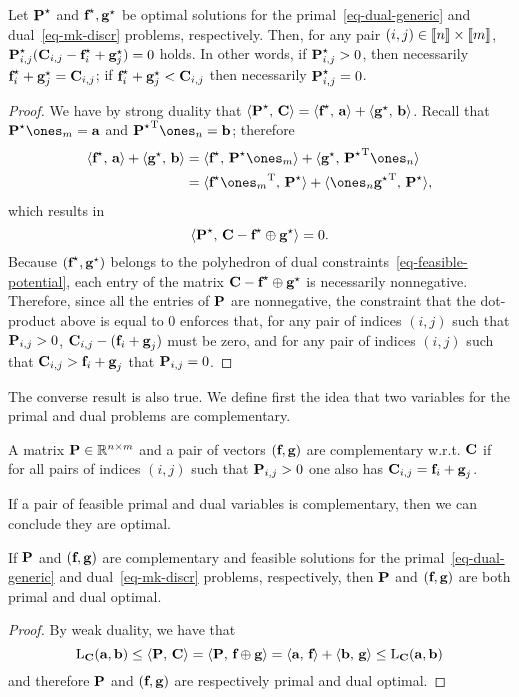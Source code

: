 \begin{prop}\label{prop-primal-dual-optimal}Let $\P^\star$ and $\fD^\star,\gD^\star$ be optimal solutions for the primal~\eqref{eq-dual-generic} and dual~\eqref{eq-mk-discr} problems, respectively. Then, for any pair $(i,j)\in\range{n}\times\range{m}$, $\P^\star_{i,j}(\C_{i,j}-\fD^\star_i+\gD^\star_j)=0$ holds. In other words, if $\P^\star_{i,j}>0$, then necessarily $\fD^\star_i+\gD^\star_j=\C_{i,j}$; if $\fD^\star_i+\gD^\star_j<\C_{i,j}$ then necessarily $\P^\star_{i,j}=0$.
\end{prop}
\begin{proof} We have by strong duality that $\dotp{\P^\star}{\C} = \dotp{\fD^\star}{\a}+\dotp{\gD^\star}{\b}$. Recall that $\P^\star\ones_m = \a$ and $\transp{\P^\star}\ones_n = \b$; therefore 
	$$\begin{aligned}\dotp{\fD^\star}{\a}+\dotp{\gD^\star}{\b} &= \dotp{\fD^\star}{\P^\star\ones_m}+\dotp{\gD^\star}{\transp{\P^\star}\ones_n}\\&=  \dotp{\fD^\star\transp{\ones_m}}{\P^\star}+\dotp{\ones_n\transp{\gD^\star}}{\P^\star},\end{aligned}$$
	which results in $$\dotp{\P^\star}{\C- \fD^\star\oplus \gD^\star}=0.$$
Because $(\fD^\star,\gD^\star)$ belongs to the polyhedron of dual constraints~\eqref{eq-feasible-potential}, each entry of the matrix $\C- \fD^\star\oplus \gD^\star$ is necessarily nonnegative. Therefore, since all the entries of $\P$ are nonnegative, the constraint that the dot-product above is equal to $0$ enforces that, for any pair of indices $(i,j)$ such that $\P_{i,j}>0$, $\C_{i,j}-(\fD_i+\gD_j)$ must be zero, and for any pair of indices $(i,j)$ such that $\C_{i,j}>\fD_i+\gD_j$ that $\P_{i,j}=0$.
\end{proof}

The converse result is also true. We define first the idea that two variables for the primal and dual problems are complementary.

\begin{defn}\label{def-complementary}
A matrix $\P\in\RR^{n\times m}$ and a pair of vectors $(\fD,\gD)$ are complementary w.r.t. $\C$ if for all pairs of indices $(i,j)$ such that  $\P_{i,j}>0$ one also has $\C_{i,j}=\fD_i+\gD_j$.
\end{defn}

If a pair of feasible primal and dual variables is complementary, then we can conclude they are optimal.

\begin{prop}\label{prop-primal-dual-optimality} If $\P$ and $(\fD,\gD)$ are complementary and feasible solutions for the primal~\eqref{eq-dual-generic} and dual~\eqref{eq-mk-discr} problems, respectively, then $\P$ and $(\fD,\gD)$ are both primal and dual optimal.
\end{prop}
\begin{proof}
	By weak duality, we have that
$$\MKD_{\C}(\a,\b)\leq \dotp{\P}{\C}=\dotp{\P}{\fD\oplus\gD}=\dotp{\a}{\fD}+\dotp{\b}{\gD}\leq \MKD_{\C}(\a,\b)$$
and therefore $\P$ and $(\fD,\gD)$ are respectively primal and dual optimal.
\end{proof}


